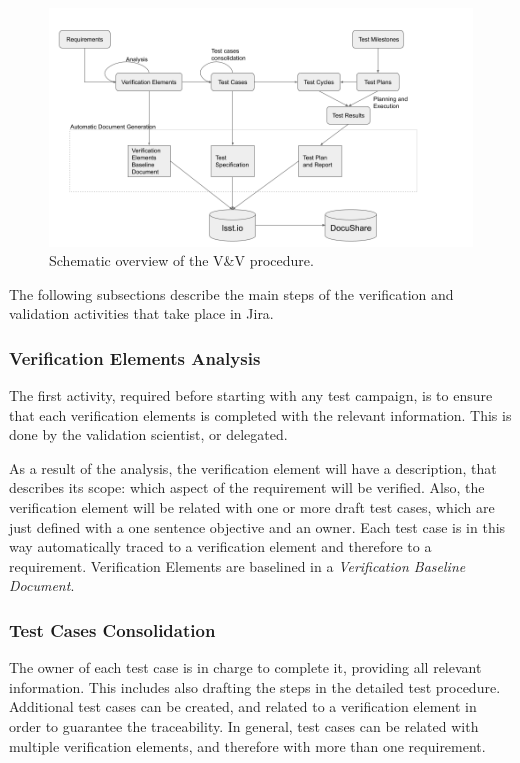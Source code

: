 \begin{figure}
\begin{center}
\includegraphics[width=\textwidth]{imgs/VandVprocedure.png}
 \caption{Schematic overview of the V\&V procedure.}
 \label{fig:vandvtools}
\end{center}
\end{figure}

The following subsections describe the main steps of the verification and validation activities that take place in Jira.


\subsubsection{Verification Elements Analysis}

The first activity, required before starting with any test campaign, is to ensure that each verification elements is completed with the relevant information.
This is done by the validation scientist, or delegated.

As a result of the analysis, the verification element will have a description, that describes its scope: which aspect of the requirement will be verified.
Also, the verification element will be related with one or more draft test cases, which are just defined with a one sentence objective and an owner.
Each test case is in this way automatically traced to a verification element and therefore to a requirement.
Verification Elements are baselined in a \textit{Verification Baseline Document}.

\subsubsection{Test Cases Consolidation}

The owner of each test case is in charge to complete it, providing all relevant information. 
This includes also drafting the steps in the detailed test procedure.
Additional test cases can be created, and related to a verification element in order to guarantee the traceability.
In general, test cases can be related with multiple verification elements, and therefore with more than one requirement.

